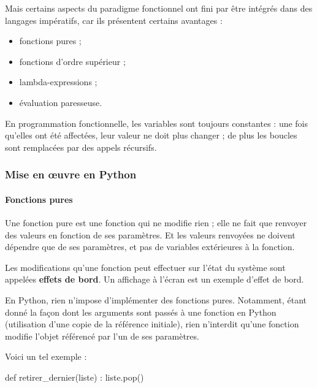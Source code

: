 \documentclass[
  letterpaper,
  DIV=11,
  numbers=noendperiod]{scrartcl}
\let\oldparagraph\paragraph
\renewcommand{\paragraph}[1]{\oldparagraph{#1}\mbox{}}
\newenvironment{Shaded}{\begin{snugshade}}{\end{snugshade}}
\newcommand{\KeywordTok}[1]{\textcolor[rgb]{0.00,0.23,0.31}{#1}}
\newcommand{\NormalTok}[1]{\textcolor[rgb]{0.00,0.23,0.31}{#1}}
\providecommand{\tightlist}{%
  \setlength{\itemsep}{0pt}\setlength{\parskip}{0pt}}\usepackage{longtable,booktabs,array}
\begin{document}
Mais certains aspects du paradigme fonctionnel ont fini par être
intégrés dans des langages impératifs, car ils présentent certains
avantages :

\begin{itemize}
\tightlist
\item
  fonctions pures ;
\item
  fonctions d'ordre supérieur ;
\item
  lambda-expressions ;
\item
  évaluation paresseuse.
\end{itemize}

En programmation fonctionnelle, les variables sont toujours constantes :
une fois qu'elles ont été affectées, leur valeur ne doit plus changer ;
de plus les boucles sont remplacées par des appels récursifs.

\hypertarget{mise-en-ux153uvre-en-python}{%
\subsubsection{Mise en œuvre en
Python}\label{mise-en-ux153uvre-en-python}}

\hypertarget{fonctions-pures}{%
\paragraph{Fonctions pures}\label{fonctions-pures}}

Une fonction pure est une fonction qui ne modifie rien ; elle ne fait
que renvoyer des valeurs en fonction de ses paramètres. Et les valeurs
renvoyées ne doivent dépendre que de ses paramètres, et pas de variables
extérieures à la fonction.

Les modifications qu'une fonction peut effectuer sur l'état du système
sont appelées \textbf{effets de bord}. Un affichage à l'écran est un
exemple d'effet de bord.

En Python, rien n'impose d'implémenter des fonctions pures. Notamment,
étant donné la façon dont les arguments sont passés à une fonction en
Python (utilisation d'une copie de la référence initiale), rien
n'interdit qu'une fonction modifie l'objet référencé par l'un de ses
paramètres.

Voici un tel exemple :

\begin{Shaded}
\begin{Highlighting}[]
\KeywordTok{def}\NormalTok{ retirer\_dernier(liste) :}
\NormalTok{    liste.pop()}
\end{Highlighting}
\end{Shaded}
\end{document}

